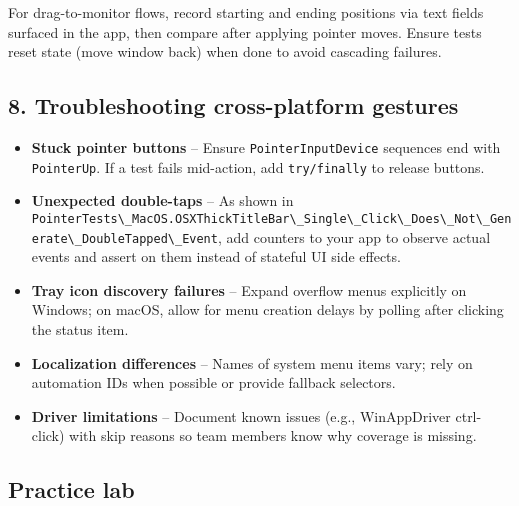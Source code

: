 For drag-to-monitor flows, record starting and ending positions via text
fields surfaced in the app, then compare after applying pointer moves.
Ensure tests reset state (move window back) when done to avoid cascading
failures.

\subsection{8. Troubleshooting cross-platform
gestures}\label{troubleshooting-cross-platform-gestures}

\begin{itemize}
\tightlist
\item
  \textbf{Stuck pointer buttons} -- Ensure
  \passthrough{\lstinline!PointerInputDevice!} sequences end with
  \passthrough{\lstinline!PointerUp!}. If a test fails mid-action, add
  \passthrough{\lstinline!try/finally!} to release buttons.
\item
  \textbf{Unexpected double-taps} -- As shown in
  \passthrough{\lstinline!PointerTests\_MacOS.OSXThickTitleBar\_Single\_Click\_Does\_Not\_Generate\_DoubleTapped\_Event!},
  add counters to your app to observe actual events and assert on them
  instead of stateful UI side effects.
\item
  \textbf{Tray icon discovery failures} -- Expand overflow menus
  explicitly on Windows; on macOS, allow for menu creation delays by
  polling after clicking the status item.
\item
  \textbf{Localization differences} -- Names of system menu items vary;
  rely on automation IDs when possible or provide fallback selectors.
\item
  \textbf{Driver limitations} -- Document known issues (e.g.,
  WinAppDriver ctrl-click) with skip reasons so team members know why
  coverage is missing.
\end{itemize}

\subsection{Practice lab}\label{practice-lab-13}

